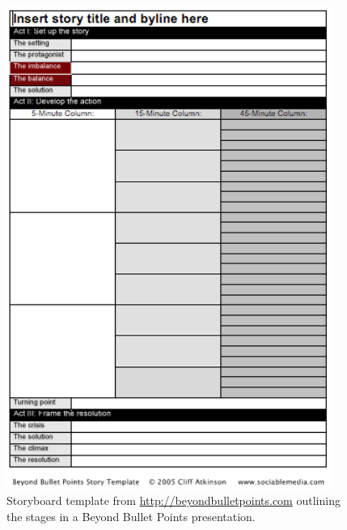 \begin{figure}[htbp]
	\centering
	\includegraphics[width=0.95\textwidth]{bbp}
	\caption{Storyboard template from \url{http://beyondbulletpoints.com} outlining the stages in a Beyond Bullet Points presentation.}
	\label{fig:bbp}
\end{figure}

